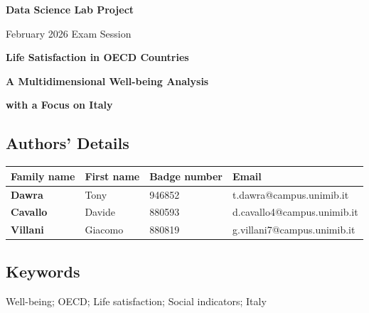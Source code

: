 \documentclass[11pt,a4paper]{article}
\begin{document}
\thispagestyle{firstpage}

\begin{center}
    \vspace*{0.3cm}
    {\Large\bfseries Data Science Lab Project}\par
    \vspace{0.2cm}
    {\large February 2026 Exam Session}\par
    \vspace{0.8cm}

    \begin{tcolorbox}[colback=lightblue,colframe=mainblue,width=0.94\textwidth,arc=3mm,boxrule=0.9pt]
    \centering
    {\Huge\bfseries\color{mainblue} Life Satisfaction in OECD Countries}\par
    \vspace{0.25cm}
    {\LARGE\bfseries A Multidimensional Well-being Analysis}\par
    \vspace{0.15cm}
    {\LARGE\bfseries with a Focus on Italy}\par
    \end{tcolorbox}
\end{center}

\vspace{0.4cm}

\subsection*{Authors' Details}
\begin{table}[H]
\centering
{}
\begin{tabularx}{\textwidth}{>{\bfseries}l l l X}
\toprule
Family name & First name & Badge number & Email \\
\midrule
Dawra & Tony & 946852 & t.dawra@campus.unimib.it \\
Cavallo & Davide & 880593 & d.cavallo4@campus.unimib.it \\
Villani & Giacomo & 880819 & g.villani7@campus.unimib.it \\
\bottomrule
\end{tabularx}
\end{table}

\subsection*{Keywords}
Well-being; OECD; Life satisfaction; Social indicators; Italy
\end{document}
